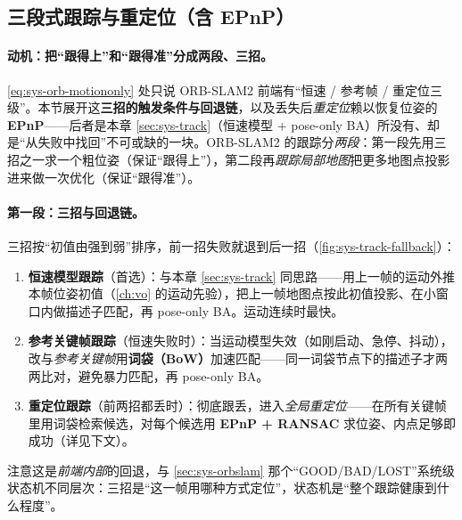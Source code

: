 \subsection{三段式跟踪与重定位（含 EPnP）}
\label{sec:sys-tracking-orb}

\paragraph{动机：把“跟得上”和“跟得准”分成两段、三招。}
\cref{eq:sys-orb-motiononly} 处只说 ORB-SLAM2 前端有“恒速 / 参考帧 / 重定位三级”。本节展开这\textbf{三招的触发条件与回退链}，以及丢失后\emph{重定位}赖以恢复位姿的 \textbf{EPnP}——后者是本章 \cref{sec:sys-track}（恒速模型 + pose-only BA）所没有、却是“从失败中找回”不可或缺的一块。ORB-SLAM2 的跟踪分\emph{两段}：第一段先用三招之一求一个粗位姿（保证“跟得上”），第二段再\emph{跟踪局部地图}把更多地图点投影进来做一次优化（保证“跟得准”）。

\paragraph{第一段：三招与回退链。}
三招按“初值由强到弱”排序，前一招失败就退到后一招（\cref{fig:sys-track-fallback}）：
\begin{enumerate}
  \item \textbf{恒速模型跟踪}（首选）：与本章 \cref{sec:sys-track} 同思路——用上一帧的运动外推本帧位姿初值（\cref{ch:vo} 的运动先验），把上一帧地图点按此初值投影、在小窗口内做描述子匹配，再 pose-only BA。运动连续时最快。
  \item \textbf{参考关键帧跟踪}（恒速失败时）：当运动模型失效（如刚启动、急停、抖动），改与\emph{参考关键帧}用\textbf{词袋（BoW）}加速匹配——同一词袋节点下的描述子才两两比对，避免暴力匹配，再 pose-only BA。
  \item \textbf{重定位跟踪}（前两招都丢时）：彻底跟丢，进入\emph{全局重定位}——在所有关键帧里用词袋检索候选，对每个候选用 \textbf{EPnP + RANSAC} 求位姿、内点足够即成功（详见下文）。
\end{enumerate}
注意这是\emph{前端内部}的回退，与 \cref{sec:sys-orbslam} 那个“GOOD/BAD/LOST”系统级状态机不同层次：三招是“这一帧用哪种方式定位”，状态机是“整个跟踪健康到什么程度”。

